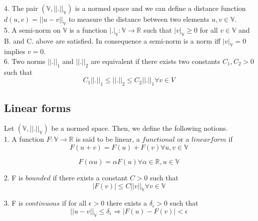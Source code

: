 \documentclass[a4paper,12pt]{book}
\begin{document}
4. The pair $(\mathbb{V},||.||_\mathbb{V})$ is a normed space and we can define a distance function $d(u,v) = ||u-v||_\mathbb{V}$ to measure the distance between two elements $u,v \in \mathbb{V}$.\\

5. A semi-norm on $\mathbb{V}$ is a function $|.|_\mathbb{V} : \mathbb{V} \rightarrow \mathbb{R}$ such that $|v|_\mathbb{V} \geq 0$ for all $v \in \mathbb{V}$ and B. and C. above are satisfied. In consequence a semi-norm is a norm iff $|v|_\mathbb{V} = 0$ implies  $v = 0$.\\

6. Two norms $||.||_1$ and $||.||_2$ are equivalent if there exists two constants $C_1,C_2 > 0$ such that \\

\begin{equation} \label{norm_equivalent}
C_1||.||_1 \leq ||.||_2 \leq C_2 ||.||_1 \forall v \in V
\end{equation}

\subsection{Linear forms}

Let $(\mathbb{V,||.||_\mathbb{V}})$ be a normed space. Then, we define the following notions.\\

1. A function $F : \mathbb{V} \rightarrow \mathbb{R}$ is said to be linear, a $functional$ or a $linear form$ if  \\

\begin{equation} 
F(u+v) = F(u) + F(v) \forall u,v \in \mathbb{V} 
\end{equation}

\begin{equation} 
F(\alpha u) = \alpha F(u) \forall \alpha \in \mathbb{R}, u \in \mathbb{V}
\end{equation}

2. F is $bounded$ if there exists a constant $C > 0$ such that\\ 
\begin{equation} 
|F(v)| \leq C ||v||_\mathbb{V} \forall v \in \mathbb{V}
\end{equation}

3. F is $continuous$ if for all $\epsilon > 0$ there exists a $\delta_\epsilon > 0$ such that \\
\begin{equation}
||u - v||_\mathbb{V} \leq \delta_\epsilon \Rightarrow  |F(u) - F(v)| < \epsilon
\end{equation}
\end{document}

